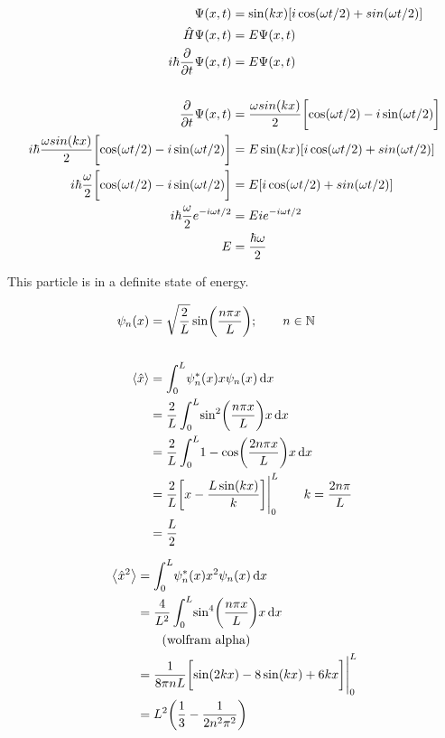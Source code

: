 \documentclass[12pt]{article}
\begin{document}
\newpage
\problemasub
\begin{align*}
\Psi(x, t) &= \sin(kx)[i\cos(\omega t/2) + sin(\omega t/2)] \\
\hat{H} \Psi(x, t) &= E \Psi(x, t) \\
i \hbar \frac{\partial}{\partial t} \Psi(x,t) &= E \Psi(x,t) \\
\\
\frac{\partial}{\partial t} \Psi(x, t) &= \frac{\omega sin(kx)}{2} \biggl [\cos(\omega t / 2)-i\sin(\omega t /2) \biggr ] \\
i\hbar\frac{\omega sin(kx)}{2} \biggl [\cos(\omega t / 2)-i\sin(\omega t /2) \biggr ] &= E \sin(kx)[i\cos(\omega t/2) + sin(\omega t/2)] \\
i\hbar\frac{\omega}{2} \biggl [\cos(\omega t / 2)-i\sin(\omega t /2) \biggr ] &= E [i\cos(\omega t/2) + sin(\omega t/2)] \\
i\hbar\frac{\omega}{2} e^{-i\omega t/2} &= E i e^{-i\omega t/2} \\
E &= \frac{\hbar\omega}{2}
\end{align*}

This particle is in a definite state of energy.


\problem

\begin{align*}
\psi_n(x) &= \sqrt{\frac{2}{L}} \sin \biggl( {\frac{n\pi x}{L}} \biggr); \qquad n \in \mathbb{N} \\ 
\\
\Braket{\hat{x}} &= \int_0^L\!\psi_n^*(x) x \psi_n(x) \, \mathrm{d} x \\
&= \frac{2}{L} \int_0^L\!\sin^2 \biggl( \frac{n\pi x}{L} \biggr) x \, \mathrm{d} x \\
&= \frac{2}{L} \int_0^L\!1 - \cos \biggl( \frac{2n\pi x}{L} \biggr) x \, \mathrm{d} x \\
&= \frac{2}{L} \biggl [x - \frac{L \sin ( kx )}{k} \biggr ] \Bigg|_0^L \qquad k = \frac{2n\pi}{L} \\
&= \frac{L}{2}
\end{align*}

\begin{align*}
\Braket{\hat{x}^2} &= \int_0^L\!\psi_n^*(x) x^2 \psi_n(x) \, \mathrm{d} x \\
&= \frac{4}{L^2} \int_0^L\!\sin^4 \biggl( \frac{n\pi x}{L} \biggr) x \, \mathrm{d} x \\
&\qquad\text{(wolfram alpha)} \\
&= \frac{1}{8 \pi n L} \biggl [ 
 \sin(2kx) -8  \sin(kx) + 6kx
\biggr ] \Bigg|_0^L \\
&= L^2 \biggl(\frac{1}{3} - \frac{1}{2n^2\pi^2} \biggr)
\end{align*}
\end{document}
